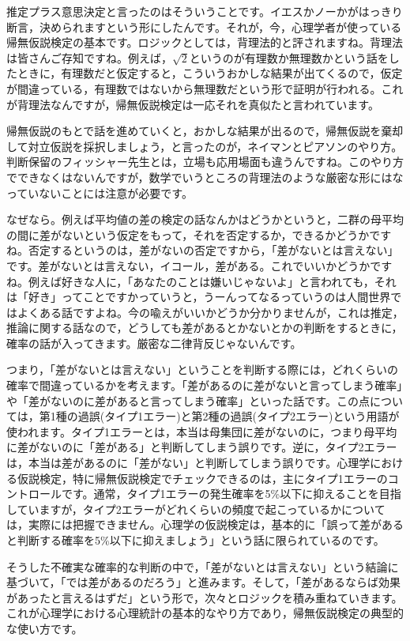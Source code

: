 \documentclass{ltjsbook}
\begin{document}
推定プラス意思決定と言ったのはそういうことです。イエスかノーかがはっきり断言，決められますという形にしたんです。それが，今，心理学者が使っている帰無仮説検定の基本です。ロジックとしては，背理法的と評されますね。背理法は皆さんご存知ですね。例えば，$\sqrt{2}$というのが有理数か無理数かという話をしたときに，有理数だと仮定すると，こういうおかしな結果が出てくるので，仮定が間違っている，有理数ではないから無理数だという形で証明が行われる。これが背理法なんですが，帰無仮説検定は一応それを真似たと言われています。

帰無仮説のもとで話を進めていくと，おかしな結果が出るので，帰無仮説を棄却して対立仮説を採択しましょう，と言ったのが，ネイマンとピアソンのやり方。判断保留のフィッシャー先生とは，立場も応用場面も違うんですね。このやり方でできなくはないんですが，数学でいうところの背理法のような厳密な形にはなっていないことには注意が必要です。

なぜなら。例えば平均値の差の検定の話なんかはどうかというと，二群の母平均の間に差がないという仮定をもって，それを否定するか，できるかどうかですね。否定するというのは，差がないの否定ですから，「差がないとは言えない」です。差がないとは言えない，イコール，差がある。これでいいかどうかですね。例えば好きな人に，「あなたのことは嫌いじゃないよ」と言われても，それは「好き」ってことですかっていうと，うーんってなるっていうのは人間世界ではよくある話ですよね。今の喩えがいいかどうか分かりませんが，これは推定，推論に関する話なので，どうしても差があるとかないとかの判断をするときに，確率の話が入ってきます。厳密な二律背反じゃないんです。

つまり，「差がないとは言えない」ということを判断する際には，どれくらいの確率で間違っているかを考えます。「差があるのに差がないと言ってしまう確率」や「差がないのに差があると言ってしまう確率」といった話です。この点については，第1種の過誤(タイプ1エラー)と第2種の過誤(タイプ2エラー)という用語が使われます。タイプ1エラーとは，本当は母集団に差がないのに，つまり母平均に差がないのに「差がある」と判断してしまう誤りです。逆に，タイプ2エラーは，本当は差があるのに「差がない」と判断してしまう誤りです。心理学における仮説検定，特に帰無仮説検定でチェックできるのは，主にタイプ1エラーのコントロールです。通常，タイプ1エラーの発生確率を5\%以下に抑えることを目指していますが，タイプ2エラーがどれくらいの頻度で起こっているかについては，実際には把握できません。心理学の仮説検定は，基本的に「誤って差があると判断する確率を5\%以下に抑えましょう」という話に限られているのです。

そうした不確実な確率的な判断の中で，「差がないとは言えない」という結論に基づいて，「では差があるのだろう」と進みます。そして，「差があるならば効果があったと言えるはずだ」という形で，次々とロジックを積み重ねていきます。これが心理学における心理統計の基本的なやり方であり，帰無仮説検定の典型的な使い方です。
\end{document}
